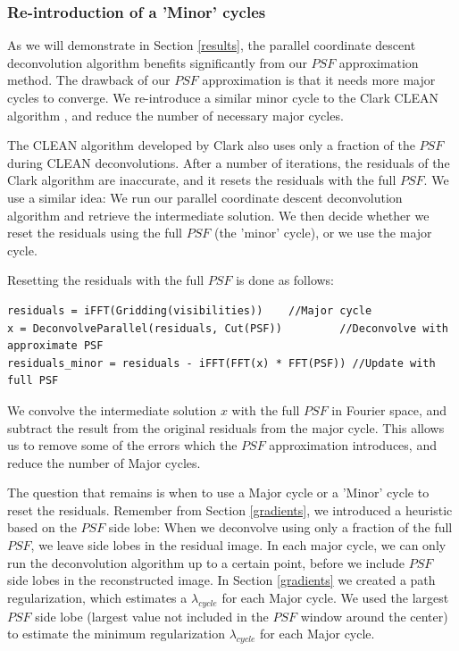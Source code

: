 \subsubsection*{Re-introduction of a 'Minor' cycles}
As we will demonstrate in Section \ref{results}, the parallel coordinate descent deconvolution algorithm benefits significantly from our $PSF$ approximation method. The drawback of our $PSF$ approximation is that it needs more major cycles to converge. We re-introduce a similar minor cycle to the Clark CLEAN algorithm \cite{clark1980efficient}, and reduce the number of necessary major cycles.

The CLEAN algorithm developed by Clark also uses only a fraction of the $PSF$ during CLEAN deconvolutions. After a number of iterations, the residuals of the Clark algorithm are inaccurate, and it resets the residuals with the full $PSF$. We use a similar idea: We run our parallel coordinate descent deconvolution algorithm and retrieve the intermediate solution. We then decide whether we reset the residuals using the full $PSF$ (the 'minor' cycle), or we use the major cycle.

Resetting the residuals with the full $PSF$ is done as follows:
\begin{lstlisting}
residuals = iFFT(Gridding(visibilities))  	//Major cycle
x = DeconvolveParallel(residuals, Cut(PSF)) 		//Deconvolve with approximate PSF
residuals_minor = residuals - iFFT(FFT(x) * FFT(PSF)) //Update with full PSF
\end{lstlisting}

We convolve the intermediate solution $x$ with the full $PSF$ in Fourier space, and subtract the result from the original residuals from the major cycle. This allows us to remove some of the errors which the $PSF$ approximation introduces, and reduce the number of Major cycles.

The question that remains is when to use a Major cycle or a 'Minor' cycle to reset the residuals. Remember from Section \ref{gradients}, we introduced a heuristic based on the $PSF$ side lobe: When we deconvolve using only a fraction of the full $PSF$, we leave side lobes in the residual image. In each major cycle, we can only run the deconvolution algorithm up to a certain point, before we include $PSF$ side lobes in the reconstructed image. In Section \ref{gradients} we created a path regularization, which estimates a $\lambda_{cycle}$ for each Major cycle. We used the largest $PSF$ side lobe (largest value not included in the $PSF$ window around the center) to estimate the minimum regularization $\lambda_{cycle}$ for each Major cycle.

